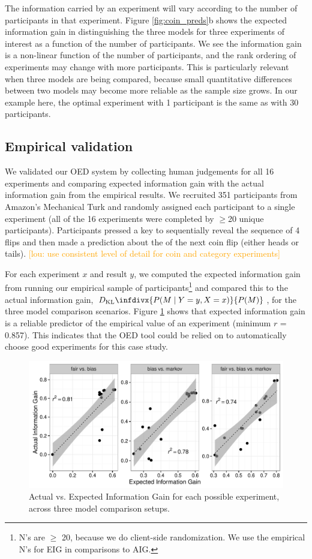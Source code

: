 \documentclass{article}
\newcommand{\dkl}{D_\mathrm{KL}\infdivx}
\newcommand{\lou}[1]{\textcolor{orange}{[lou: #1]}}
\begin{document}
The information carried by an experiment will vary according to the number of participants in that experiment.
Figure \ref{fig:coin_preds}b shows the expected information gain in distinguishing the three models for three experiments of interest as a function of the number of participants.
We see the information gain is a non-linear function of the number of participants, and the rank ordering of experiments may change with more participants.
This is particularly relevant when three models are being compared, because small quantitative differences between two models may become more reliable as the sample size grows.
In our example here, the optimal experiment with 1 participant is the same as with 30 participants.


\subsection{Empirical validation}
We validated our OED system by collecting human judgements for all 16 experiments and comparing expected information gain with the actual information gain from the empirical results.
We recruited 351 participants from Amazon's Mechanical Turk and randomly assigned each participant to a single experiment (all of the 16 experiments were completed by $\geq$20 unique participants).
Participants pressed a key to sequentially reveal the sequence of 4 flips and then made a prediction about the of the next coin flip (either heads or tails).
\lou{use consistent level of detail for coin and category experiments}

For each experiment $x$ and result $y$, we computed the expected information gain from running our empirical sample of participants\footnote{N's are $\geq$ 20, because we do client-side randomization. We use the empirical N's for EIG in comparisons to AIG.} and compared this to the actual information gain, $\dkl{P(M \mid Y = y, X = x)}{P(M)}$, for the three model comparison scenarios.
Figure \ref{fig:aig_vs_eig} shows that expected information gain is a reliable predictor of the empirical value of an experiment (minimum $r$ = 0.857). This indicates that the OED tool could be relied on to automatically choose good experiments for this case study.

\begin{figure}[t]
\centering
\includegraphics[width=0.7\columnwidth]{img/coin_eig_aig_scatter_noText.pdf}
\caption{Actual vs. Expected Information Gain for each possible experiment, across three model comparison setups.}
\label{fig:aig_vs_eig}
\end{figure}
\end{document}
